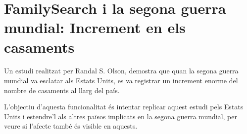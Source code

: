 \section{FamilySearch i la segona guerra mundial: Increment en els casaments}

    \paragraph{}
    Un estudi realitzat per Randal S. Olson, demostra que quan la segona guerra mundial va esclatar als Estats Units, es va registrar un increment enorme del nombre de casaments al llarg del país.

    L'objectiu d'aquesta funcionalitat és intentar replicar aquest estudi pels Estats Units i estendre'l als altres països implicats en la segona guerra mundial, per veure si l'afecte també és visible en aquests.
